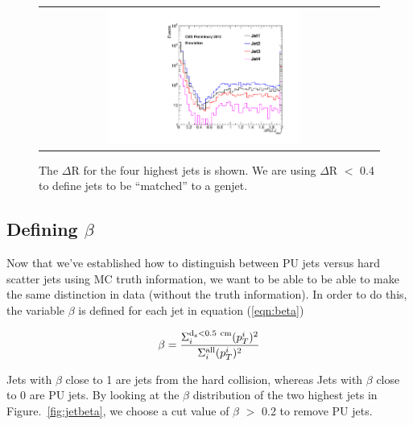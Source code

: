 \begin{figure}[!h]
\begin{center}
\begin{tabular}{cc}
\includegraphics[width=0.6\textwidth]{plots/dralljets.pdf}
\end{tabular}
\caption{The $\Delta$R for the four highest \pt jets is shown. We are using $\Delta$R $<$ 0.4 to define jets to be ``matched'' to a genjet.
\label{fig:dralljets}
}
\end{center}
\end{figure}

\subsection{Defining $\beta$}
Now that we've established how to distinguish between PU jets versus hard scatter jets using MC truth information, we want to be able to be able to make the same distinction in data (without the truth information). In order to do this, the variable $\beta$ is defined for each jet in equation (\ref{eqn:beta}) 

\begin{equation}
\beta = \frac{\Sigma_{i}^{\rm{d_z<0.5~cm}} (p_{T}^{i})^2}{\Sigma_{i}^{\rm{all}}  (p_{T}^{i})^2}
\label{eqn:beta}
\end{equation}


Jets with $\beta$ close to 1 are jets from the hard collision, whereas Jets with $\beta$ close to 0 are PU jets. By looking at the $\beta$ distribution of the two highest \pt jets in Figure.~\ref{fig:jetbeta}, we choose a cut value of $\beta$ $>$ 0.2 to remove PU jets. 

